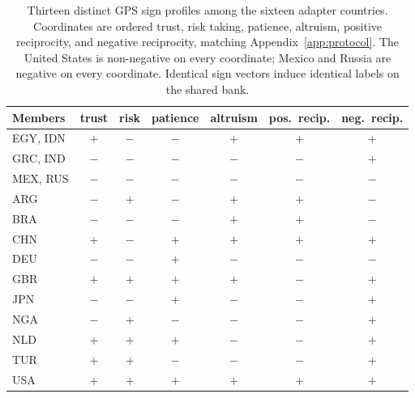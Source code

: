 \begin{table}[htbp]\centering\small
\caption{Thirteen distinct GPS sign profiles among the sixteen adapter countries. Coordinates are ordered trust, risk taking, patience, altruism, positive reciprocity, and negative reciprocity, matching Appendix~\ref{app:protocol}. The United States is non-negative on every coordinate; Mexico and Russia are negative on every coordinate. Identical sign vectors induce identical labels on the shared bank.}\label{tab:signprofiles}
\begin{tabular}{lcccccc}\toprule
Members & trust & risk & patience & altruism & pos.\ recip. & neg.\ recip. \\\midrule
EGY, IDN & $+$ & $-$ & $-$ & $+$ & $+$ & $+$ \\
GRC, IND & $-$ & $-$ & $-$ & $-$ & $-$ & $+$ \\
MEX, RUS & $-$ & $-$ & $-$ & $-$ & $-$ & $-$ \\
ARG & $-$ & $+$ & $-$ & $+$ & $+$ & $-$ \\
BRA & $-$ & $-$ & $-$ & $+$ & $+$ & $-$ \\
CHN & $+$ & $-$ & $+$ & $+$ & $+$ & $+$ \\
DEU & $-$ & $-$ & $+$ & $-$ & $-$ & $-$ \\
GBR & $+$ & $+$ & $+$ & $+$ & $-$ & $+$ \\
JPN & $-$ & $-$ & $+$ & $-$ & $-$ & $+$ \\
NGA & $-$ & $+$ & $-$ & $-$ & $-$ & $+$ \\
NLD & $+$ & $+$ & $+$ & $-$ & $-$ & $+$ \\
TUR & $+$ & $+$ & $-$ & $-$ & $-$ & $+$ \\
USA & $+$ & $+$ & $+$ & $+$ & $+$ & $+$ \\
\bottomrule
\end{tabular}\end{table}
